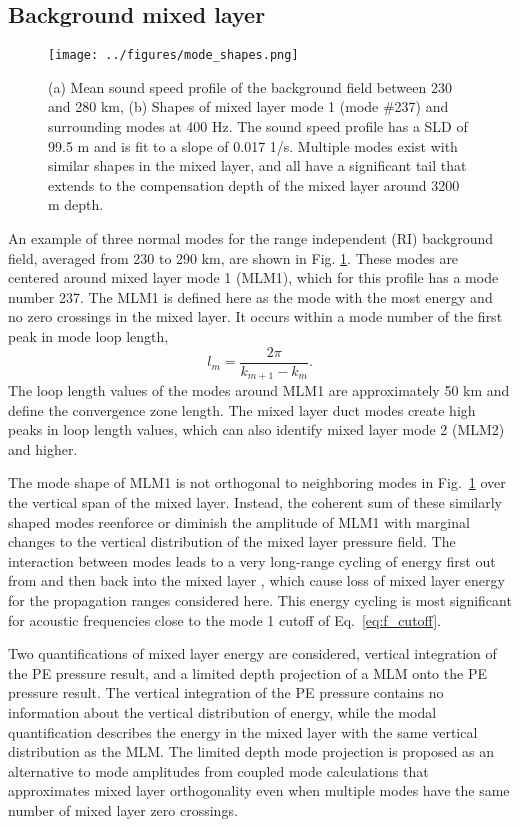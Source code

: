 \documentclass[preprint,NumberedRefs]{JASA}
\begin{document}
\subsection{Background mixed layer}\label{ssec:bg}
\begin{figure}
\texttt{[image: ../figures/mode\_shapes.png]}
    \caption{\label{fig:bg_modes}{(a) Mean sound speed profile of the background field between 230 and 280 km, (b) Shapes of mixed layer mode 1 (mode \#237) and surrounding modes at 400 Hz. The sound speed profile has a SLD of 99.5 m and is fit to a slope of 0.017 1/s. Multiple modes exist with similar shapes in the mixed layer, and all have a significant tail that extends to the compensation depth of the mixed layer around 3200 m depth.}}
\end{figure}
An example of three normal modes for the range independent (RI) background field, averaged from 230 to 290 km, are shown in Fig. \ref{fig:bg_modes}. These modes are centered around mixed layer mode 1 (MLM1), which for this profile has a mode number 237. The MLM1 is defined here as the mode with the most energy and no zero crossings in the mixed layer. It occurs within a mode number of the first peak in mode loop length\citep{jensen2011computational},
\begin{equation}
    l_{m} = \frac{2 \pi}{k_{m+1} - k_m}.
    \label{eq:loop_length}
\end{equation}
The loop length values of the modes around MLM1 are approximately 50 km and define the convergence zone length. The mixed layer duct modes create high peaks in loop length values, which can also identify mixed layer mode 2 (MLM2) and higher.

The mode shape of MLM1 is not orthogonal to neighboring modes in Fig.~\ref{fig:bg_modes} over the vertical span of the mixed layer. Instead, the coherent sum of these similarly shaped modes reenforce or diminish the amplitude of MLM1 with marginal changes to the vertical distribution of the mixed layer pressure field. The interaction between modes leads to a very long-range cycling of energy first out from and then back into the mixed layer \citep{porter93,colosi2020observations}, which cause loss of mixed layer energy for the propagation ranges considered here. This energy cycling is most significant for acoustic frequencies close to the mode 1 cutoff of Eq.~\eqref{eq:f_cutoff}.

Two quantifications of mixed layer energy are considered, vertical integration of the PE pressure result, and a limited depth projection of a MLM onto the PE pressure result. The vertical integration of the PE pressure contains no information about the vertical distribution of energy, while the modal quantification describes the energy in the mixed layer with the same vertical distribution as the MLM. The limited depth mode projection is proposed as an alternative to mode amplitudes from coupled mode calculations that approximates mixed layer orthogonality even when multiple modes have the same number of mixed layer zero crossings.
\end{document}
